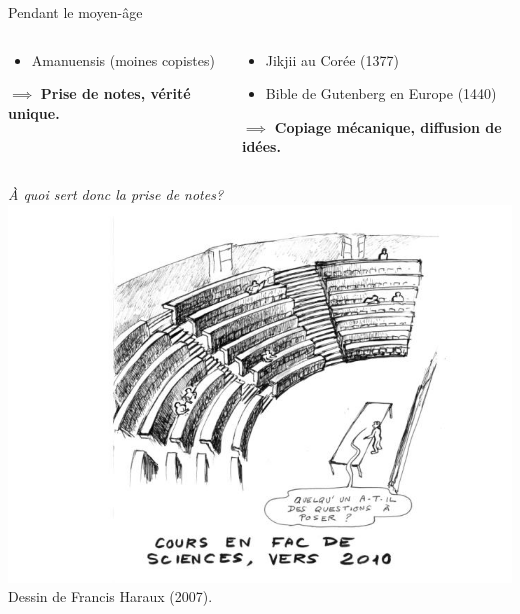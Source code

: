 \begin{frame}{Pendant le moyen-âge}
\begin{columns}
\begin{column}{0.49\linewidth}
\begin{itemize}
			\item Amanuensis (moines copistes)
		\end{itemize}
		$\implies$ \textbf{Prise de notes, vérité unique.}
	\end{column}
	\begin{column}{0.49\linewidth}
		\begin{itemize}
			\item Jikjii au Corée (1377)
			\item Bible de Gutenberg en Europe (1440)
		\end{itemize}
		$\implies$ \textbf{Copiage mécanique, diffusion de idées.}
	\end{column}
\end{columns}
\end{frame}
\begin{frame}
\centering
\huge \emph{À quoi sert donc la prise de notes?}
\vfill
\centering
\includegraphics[height=0.5\paperheight]{../resources/illustrations/cours_magistral} \\
\vfill \hfill
\large Dessin de Francis Haraux (2007).\hfill \hfill
\end{frame}

